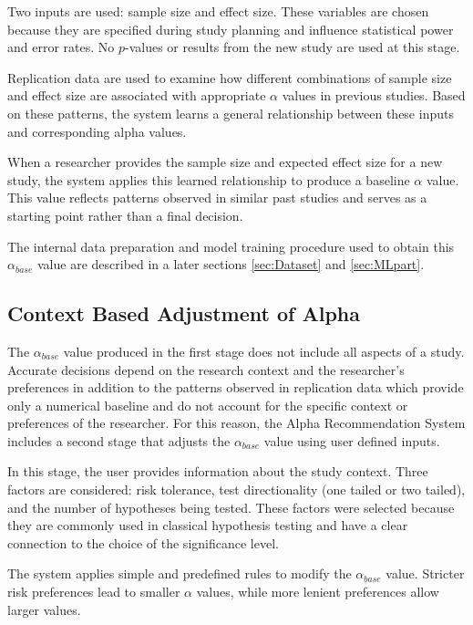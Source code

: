Two inputs are used: sample size and effect size. These variables are chosen because they are specified during study planning and influence statistical power and error rates\cite{PetersonFoley2021}. No $p$-values or results from the new study are used at this stage.

Replication data are used to examine how different combinations of sample size and effect size are associated with appropriate $\alpha$ values in previous studies. Based on these patterns, the system learns a general relationship between these inputs and corresponding alpha values.

When a researcher provides the sample size and expected effect size for a new study, the system applies this learned relationship to produce a baseline $\alpha$ value. This value reflects patterns observed in similar past studies and serves as a starting point rather than a final decision.

The internal data preparation and model training procedure used to obtain this $\alpha_{base}$ value are described in a later sections \ref{sec:Dataset} and \ref{sec:MLpart}.

\subsection{Context Based Adjustment of Alpha}
\label{sec:contextadjust}
The $\alpha_{base}$ value produced in the first stage does not include all aspects of a study. Accurate decisions depend on the research context and the researcher’s preferences in addition to the patterns observed in replication data which provide only a numerical baseline and do not account for the specific context or preferences of the researcher. For this reason, the Alpha Recommendation System includes a second stage that adjusts the $\alpha_{base}$ value using user defined inputs.

In this stage, the user provides information about the study context. Three factors are considered: risk tolerance, test directionality (one tailed or two tailed), and the number of hypotheses being tested. These factors were selected because they are commonly used in classical hypothesis testing and have a clear connection to the choice of the significance level.

The system applies simple and predefined rules to modify the $\alpha_{base}$ value. Stricter risk preferences lead to smaller $\alpha$ values, while more lenient preferences allow larger values\cite{Baker2016}.

